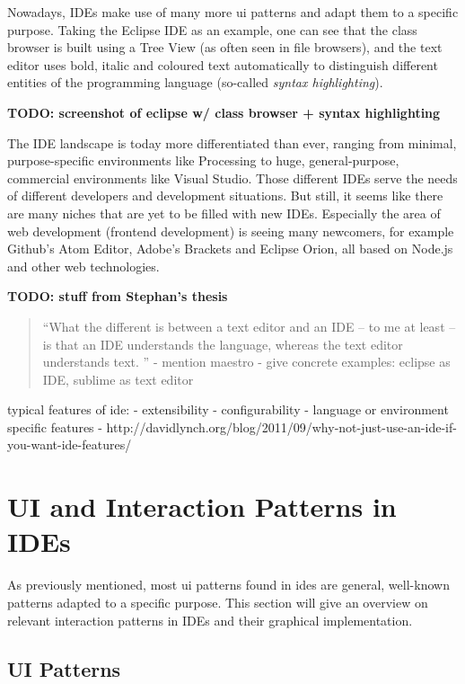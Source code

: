 Nowadays, IDEs make use of many more \gls{ui} patterns and adapt them to
a specific purpose. Taking the Eclipse IDE as an example, one can see
that the class browser is built using a Tree View (as often seen in file
browsers), and the text editor uses bold, italic and coloured text
automatically to distinguish different entities of the programming
language (so-called \emph{syntax highlighting}).

\textbf{TODO: screenshot of eclipse w/ class browser + syntax
highlighting}

The IDE landscape is today more differentiated than ever, ranging from
minimal, purpose-specific environments like Processing to huge,
general-purpose, commercial environments like Visual Studio. Those
different IDEs serve the needs of different developers and development
situations. But still, it seems like there are many niches that are yet
to be filled with new IDEs. Especially the area of web development
(frontend development) is seeing many newcomers, for example Github’s
Atom Editor, Adobe’s Brackets and Eclipse Orion, all based on Node.js
and other web technologies.

\textbf{TODO: stuff from Stephan’s thesis}

\begin{quote}
“What the different is between a text editor and an IDE – to me at least
– is that an IDE understands the language, whereas the text editor
understands text. ” - mention maestro - give concrete examples: eclipse
as IDE, sublime as text editor
\end{quote}

typical features of ide: - extensibility - configurability - language or
environment specific features -
http://davidlynch.org/blog/2011/09/why-not-just-use-an-ide-if-you-want-ide-features/

\section{UI and Interaction Patterns in
IDEs}\label{ui-and-interaction-patterns-in-ides}

As previously mentioned, most \gls{ui} patterns found in \glspl{ide} are
general, well-known patterns adapted to a specific purpose. This section
will give an overview on relevant interaction patterns in IDEs and their
graphical implementation.

\subsection{UI Patterns}\label{ui-patterns}

